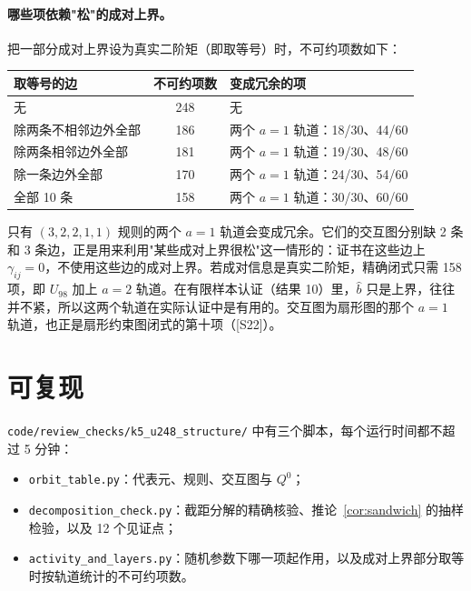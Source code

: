 \documentclass[11pt,a4paper]{article}
\theoremstyle{remark}
\begin{document}
\paragraph{哪些项依赖"松"的成对上界。}把一部分成对上界设为真实二阶矩（即取等号）时，不可约项数如下：

\begin{center}
\small
\begin{tabular}{@{}lcl@{}}
\toprule
取等号的边 & 不可约项数 & 变成冗余的项 \\
\midrule
无 & 248 & 无 \\
除两条不相邻边外全部 & 186 & 两个 $a=1$ 轨道：18/30、44/60 \\
除两条相邻边外全部 & 181 & 两个 $a=1$ 轨道：19/30、48/60 \\
除一条边外全部 & 170 & 两个 $a=1$ 轨道：24/30、54/60 \\
全部 10 条 & 158 & 两个 $a=1$ 轨道：30/30、60/60 \\
\bottomrule
\end{tabular}
\end{center}

只有 $(3,2,2,1,1)$ 规则的两个 $a=1$ 轨道会变成冗余。它们的交互图分别缺 2 条和 3 条边，正是用来利用"某些成对上界很松"这一情形的：证书在这些边上 $\gamma_{ij}=0$，不使用这些边的成对上界。若成对信息是真实二阶矩，精确闭式只需 158 项，即 $U_{98}$ 加上 $a=2$ 轨道。在有限样本认证（结果 10）里，$\hat b$ 只是上界，往往并不紧，所以这两个轨道在实际认证中是有用的。交互图为扇形图的那个 $a=1$ 轨道，也正是扇形约束图闭式的第十项（[S22]）。

\section{可复现}
\texttt{code/review\_checks/k5\_u248\_structure/} 中有三个脚本，每个运行时间都不超过 5 分钟：
\begin{itemize}
\item \texttt{orbit\_table.py}：代表元、规则、交互图与 $Q^0$；
\item \texttt{decomposition\_check.py}：截距分解的精确核验、推论~\ref{cor:sandwich} 的抽样检验，以及 12 个见证点；
\item \texttt{activity\_and\_layers.py}：随机参数下哪一项起作用，以及成对上界部分取等时按轨道统计的不可约项数。
\end{itemize}
\end{document}
